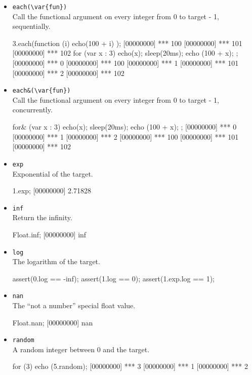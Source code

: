 \begin{itemize}
\item \lstinline|each(\var{fun})|\\
  Call the functional argument  on every integer from 0 to
  target - 1, sequentially.
\begin{urbiscript}[firstnumber=last]
3.each(function (i) { echo(100 + i) });
[00000000] *** 100
[00000000] *** 101
[00000000] *** 102
for (var x : 3) { echo(x); sleep(20ms); echo (100 + x); };
[00000000] *** 0
[00000000] *** 100
[00000000] *** 1
[00000000] *** 101
[00000000] *** 2
[00000000] *** 102
\end{urbiscript}

\item \lstinline|each&(\var{fun})|\\
  Call the functional argument  on every integer from 0 to
  target - 1, concurrently.
\begin{urbiscript}[firstnumber=last]
for& (var x : 3) { echo(x); sleep(20ms); echo (100 + x); };
[00000000] *** 0
[00000000] *** 1
[00000000] *** 2
[00000000] *** 100
[00000000] *** 101
[00000000] *** 102
\end{urbiscript}

\item \lstinline|exp|\\
  Exponential of the target.
\begin{urbiscript}[firstnumber=last]
1.exp;
[00000000] 2.71828
\end{urbiscript}

\item \lstinline|inf|\\
  Return the infinity.
\begin{urbiscript}[firstnumber=last]
Float.inf;
[00000000] inf
\end{urbiscript}

\item \lstinline|log|\\
  The logarithm of the target.
\begin{urbiscript}[firstnumber=last]
assert(0.log == -inf);
assert(1.log == 0);
assert(1.exp.log == 1);
\end{urbiscript}

\item \lstinline|nan|\\
  The ``not a number'' special float value.
\begin{urbiscript}[firstnumber=last]
Float.nan;
[00000000] nan
\end{urbiscript}

\item \lstinline|random|\\
  A random integer between 0 and the target.
\begin{urbiscript}[firstnumber=last]
for (3)
  echo (5.random);
[00000000] *** 3
[00000000] *** 1
[00000000] *** 2
\end{urbiscript}


\end{itemize}
